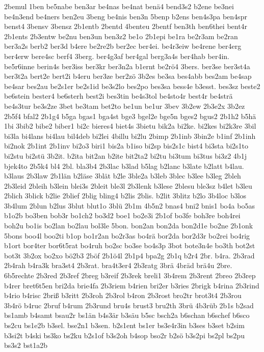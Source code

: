 {2bemul
1ben
be5nabe
ben3ar
be4nas
be4nat
benä4
bend3s2
b2ene
be3nei
be4n3end
be4ners
ben2eu
3beng
be4nis
ben3n
5benp
b2ens
ben4s3pa
ben4spr
benst4
3bensv
3bensz
2b1entb
2bentd
4benteu
2bentf
ben3th
ben6thei
bent4r
2b1ents
2b3entw
be2nu
ben3un
ben3z2
be1o
2b1epi
be1ra
be2r3am
be2ran
ber3a2s
berb2
ber3d
b4ere
be2re2b
ber2ec
ber4ei.
be4r3eiw
be4rene
ber4erg
ber4erw
bere4sc
berf4
3berg.
ber4g3af
ber4gal
berg3a4s
ber4hab
ber4in.
be5r6inne
berin4s
ber3iss
ber3kr
ber3n2a
b1ernt
be2rö4
3bers.
ber3se
ber3st4a
ber3t2a
bert2e
bert2i
b4eru
ber3ze
ber2zö
3b2es
be3sa
bes4abb
bes2am
be4sap
be4sar
bes2au
be2s1er
be2s1id
be3s2lo
bes2po
bes3sa
bess4e
b3esst.
bes3sz
beste2
be6stein
bester4
be6sterh
best2i
bes3tin
be4s3tol
be4sto4r
best4r
be4strä
be4s3tur
be3s2ze
3bet
be3tam
bet2to
be1un
be1ur
3bev
3b2ew
2b3e2x
3b2ez
2b5f4
bfal2
2b1g4
b5ga
bgas1
bga4st
bge3
bgel2e
bge5n
bges2
bgus2
2b1h2
b5hä
1bi
3bib2
bibe2
biber1
bi2c
bieres4
biet4s
3bietu
bik2a
bi2ke.
bi2kes
bi2k3re
3bil
bi3la
bi4lans
bi4lau
bil4deb
bi2lei
4billu
bi2lu
2bimp
2b1inb
3bin2e
b1inf
2b1inh
bi2nok
2b1int
2b1inv
bi2o3
biri1
bis2a
b1iso
bi2sp
bis2s1c
bist4
bi3sta
bi2s1to
bi2stu
bi2stü
3b2it.
b2ita
bit2an
b2ite
bit2ta2
bi2tu
bi3tum
bi3tus
bi3z2
4b1j
bjek4to
2b5k4
bl4
2bl.
bla3b4
2b3lac
b3lad
b5lag
b2lanc
b3late
b2latt
b4lau.
b3laus
2b3law
2b1län
b2läse
3blät
b2le
3ble2a
b3leb
3blec
b3lee
b3leg
2bleh
2b3leid
2bleih
b3lein
blei3s
2bleit
ble3l
2b3lenk
b3lese
2blesu
ble3sz
b4let
b3leu
2blich
3blick
b2lie
2blief
2blig
bling4
b2lis
2blis.
b2lit
3blitz
b2lo
3b4loc
b3los
3b4lum
2blun
b2lus
3blut
blut1o
3blü
2b1m
4b5n2
bnas4
bni2
bnis1
bo4a
bo5as
b1o2b
bo3ben
bob3r
bo1ch2
bo3d2
boe1
bo2e3i
2b1of
bo3fe
boh3re
boh4rei
boh2u
bo1is
bo2lan
bo2lau
bol3le
5bon.
bon2an
bon2da
bon2d1e
bo2ne
2b1onk
5bons
boo4l
boo2ti
b1op
bo1r2an
bo2r3as
bo4rä
bor2da
bor2d3r
bo2rei
bo4rig
b1ort
bor4ter
bor6t5rat
bo4ruh
bo2sc
bo3se
bo4s3p
3bot
bote3n4e
bo3th
bot2st
bot3t
3b2ox
bo2xo
bö2b3
2böf
2b1ö4l
2b1p4
bpa2g
2b1q
b2r4
2br.
b4ra.
2b3rad
2b4rah
b4ra3k
bra3st4
2b3rat.
bra4t3er4
2b3ratg
3brä
4bräd
brä4u
2bre.
6b5rechte
2b3red
2b3ref
2breg
b3reif
2b3rek
breli1
3b4rem
2b3rent
2breo
2b3rep
b4rer
bret6t5en
bri2da
brie4fa
2b3riem
b4rien
bri2er
b3ries
2brigk
b4rina
2b3rind
b4rio
b4risc
2briß
b3ritt
2b3roh
2b3rol
b4ron
2b3rost
bro2tr
brot3t4
2b3rou
3b4rö
b4ruc
2bruf
b4rum
2b3rund
bru4s
brust3
bru2th
3brü
4b3rüb
2b1s
b2sad
bs1amb
b4samt
bsau2r
bs1än
b4s3är
b3säu
b5sc
bsch2a
b6schan
b6schef
b6sco
bs2cu
bs1e2b
b3sel.
bse2n1
b3sen.
b2s1ent
bs1er
bs3e4r3in
b3ses
b3set
b2sim
b3si2t
b4ski
bs3ko
bs2ku
b2s1of
b3s2oh
b4sop
bso2r
b2sö
b3s2pi
bs2pl
bs2pu
bs3s2
bst1a2b
}
